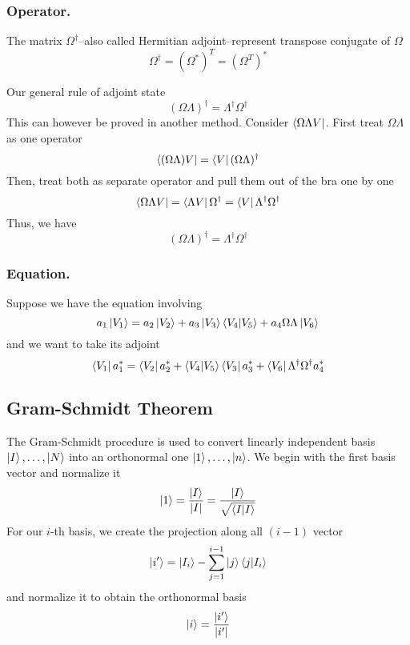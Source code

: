 \documentclass[../main.tex]{subfiles}
\begin{document}
\subsubsection*{Operator.}
The matrix $\Omega^\dagger$--also called Hermitian adjoint--represent transpose conjugate of $\Omega$
\begin{equation*}
	\Omega^{\dagger}=(\Omega^*)^T=(\Omega^T)^*
\end{equation*}

Our general rule of adjoint state
\begin{equation*}
	(\Omega\Lambda)^\dagger=\Lambda ^\dagger \Omega ^\dagger
\end{equation*}
This can however be proved in another method.
Consider $\bra{\Omega \Lambda V}$. First treat $\Omega\Lambda$ as one operator
\begin{equation*}
	\bra{(\Omega\Lambda)V}=\bra{V}(\Omega\Lambda) ^\dagger
\end{equation*}
Then, treat both as separate operator and pull them out of the bra one by one
\begin{equation*}
	\bra{\Omega\Lambda V}=\bra{\Lambda V}\Omega^\dagger=\bra{V}\Lambda ^\dagger \Omega ^\dagger
\end{equation*}
Thus, we have
\begin{equation*}
	(\Omega\Lambda) ^\dagger=\Lambda ^\dagger\Omega ^\dagger
\end{equation*}

\subsubsection*{Equation.}
Suppose we have the equation involving
\begin{equation*}
	a_1 \ket{V_1}=a_2 \ket{V_2}+a_3 \ket{V_3}\braket{V_4|V_5}+a_4\Omega\Lambda \ket{V_6}
\end{equation*}
and we want to take its adjoint
\begin{equation*}
	\bra{V_1}a_1 ^*=\bra{V_2}a_2 ^*+\braket{V_4|V_5}\bra{V_3}a_3 ^*+\bra{V_6}\Lambda ^\dagger\Omega ^\dagger a_4 ^*
\end{equation*}

\subsection*{Gram-Schmidt Theorem}
The Gram-Schmidt procedure is used to convert linearly independent basis $\ket{I},\dots,\ket{N}$ into an orthonormal one $\ket{1},\dots,\ket{n}$.
We begin with the first basis vector and normalize it
\begin{equation*}
	\ket{1}=\frac{\ket{I}}{|I|}=\frac{\ket{I}}{\sqrt{\braket{I|I}}}
\end{equation*}
For our $i$-th basis, we create the projection along all $(i-1)$ vector
\begin{equation*}
	\ket{i'}=\ket{I_i}-\sum_{j=1}^{i-1}\ket{j}\braket{j|I_i}
\end{equation*}
and normalize it to obtain the orthonormal basis
\begin{equation*}
	\ket{i}=\frac{\ket{i'}}{|i'|}
\end{equation*}
\end{document}
